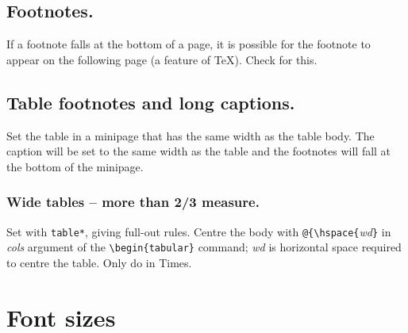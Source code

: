 \documentclass[cup6a]{cupbook}
\begin{document}
\subsection{Footnotes.}
If a footnote falls at the bottom of a page, it is possible for
the footnote to appear on the following page (a feature of \TeX ).
Check for this.

\subsection{Table footnotes and long captions.}
Set the table in a minipage that has the same width as the table body.
The caption will be set to the same width as the table and the footnotes
will fall at the bottom of the minipage.

\subsubsection{Wide tables -- more than 2/3 measure.}
Set with \verb"table*", giving full-out rules. Centre the body with
\verb"@{\hspace{"\textit{wd}\verb"}" in \textit{cols} argument of the
\verb"\begin{tabular}" command; \textit{wd} is horizontal space required
to centre the table. Only do in Times.


\section{Font sizes}
\end{document}
